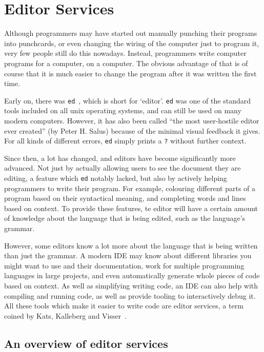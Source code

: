 

\chapter{Editor Services}
\label{chap:editor-services}

Although programmers may have started out manually punching their programs into punchcards,
or even changing the wiring of the computer just to program it, very few people still do this nowadays.
Instead, programmers write computer programs for a computer, on a computer.
The obvious advantage of that is of course that it is much easier to change the program after
it was written the first time.

Early on, there was \texttt{ed}~\autocite{ed}, which is short for `editor'.
\texttt{ed} was one of the standard tools included on all unix operating systems, and can still be used on many modern computers.
However, it has also been called ``the most user-hostile editor ever created'' (by Peter H. Salus) because of the
minimal visual feedback it gives.
For all kinds of different errors, \texttt{ed} simply prints a \texttt{?} without further context.

Since then, a lot has changed, and editors have become significantly more advanced.
Not just by actually allowing users to see the document they are editing, a feature which \texttt{ed} notably lacked,
but also by actively helping programmers to write their program.
For example, colouring different parts of a program based on their syntactical meaning, and completing words and lines based on context.
To provide these features, te editor will have a certain amount of knowledge about the language that is being edited, such as the language's grammar.

However, some editors know a lot more about the language that is being written than just the grammar.
A modern \ac{IDE} may know about different libraries you might want to use and their documentation,
work for multiple programming languages in large projects, and even automatically generate whole pieces of code based on context.
As well as simplifying writing code, an \ac{IDE} can also help with compiling and running code, as well as provide tooling to interactively debug it.
All these tools which make it easier to write code are editor services, a term coined by Kats, Kalleberg and Visser~\autocite*{KatsKV08}.

\section{An overview of editor services}\label{sec:an-overview-of-editor-services}

